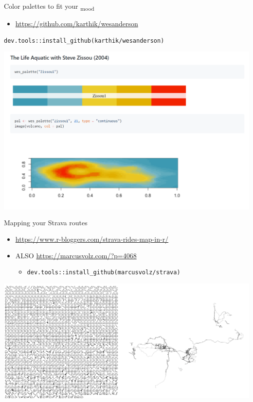 \documentclass[
  ignorenonframetext,
]{beamer}
\providecommand{\tightlist}{%
  \setlength{\itemsep}{0pt}\setlength{\parskip}{0pt}}
\begin{document}
\begin{frame}[fragile]{Color palettes to fit your \textsubscript{mood}}
\protect\hypertarget{color-palettes-to-fit-your-mood}{}

\begin{itemize}
\tightlist
\item
  \url{https://github.com/karthik/wesanderson}
\end{itemize}

\texttt{dev.tools::install\_github(karthik/wesanderson)}

\includegraphics{../external/images/funR_3_wes_anderson.png}

\end{frame}

\begin{frame}[fragile]{Mapping your Strava routes}
\protect\hypertarget{mapping-your-strava-routes}{}

\begin{itemize}
\tightlist
\item
  \url{https://www.r-bloggers.com/strava-rides-map-in-r/}
\item
  ALSO \url{https://marcusvolz.com/?p=4068}

  \begin{itemize}
  \tightlist
  \item
    \texttt{dev.tools::install\_github(marcusvolz/strava)}
  \end{itemize}
\end{itemize}

\includegraphics{../external/images/funR_4_strava_combo.png}

\end{frame}
\end{document}
